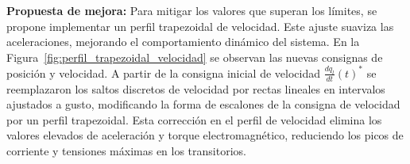 \documentclass{article}
\begin{document}
\textbf{Propuesta de mejora:} 
Para mitigar los valores que superan los límites, se propone implementar un perfil trapezoidal de velocidad. Este ajuste suaviza las aceleraciones, mejorando el comportamiento dinámico del sistema.
En la Figura~\ref{fig:perfil_trapezoidal_velocidad} se observan las nuevas consignas de posición y velocidad. A partir de la consigna inicial de velocidad \(\frac{dq_l}{dt}(t)^*\) se reemplazaron los saltos discretos de velocidad por rectas lineales en intervalos ajustados a gusto, modificando la forma de escalones de la consigna de velocidad por un perfil trapezoidal. Esta corrección en el perfil de velocidad elimina los valores elevados de aceleración y torque electromagnético, reduciendo los picos de corriente y tensiones máximas en los transitorios.
\end{document}
